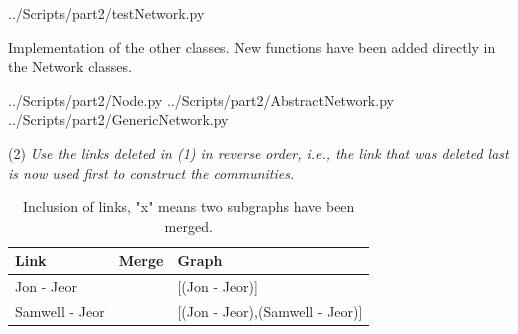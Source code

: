 \documentclass[10pt,a4paper]{article}
\begin{document}
\begin{enumerate}
	 {../Scripts/part2/testNetwork.py}
	
	Implementation of the other classes. New functions have been added directly in the Network classes. 
	
	 {../Scripts/part2/Node.py}
	 {../Scripts/part2/AbstractNetwork.py}
	 {../Scripts/part2/GenericNetwork.py}
	
	(2) \textit{Use the links deleted in (1) in reverse order, i.e., the link that was deleted last is now
		used first to construct the communities.}
	
\begin{table}[H]
	\centering
	\caption{Inclusion of links, "x" means two subgraphs have been merged.}
	\label{tabitab}
	\begin{tabular}{|l|l|l|}
		\hline
		Link              & Merge & Graph                                                                                                                                                                                                                                                                                                                                                                                                                                                                                                \\ \hline
		Jon - Jeor        &       & {[}(Jon - Jeor){]}                                                                                                                                                                                                                                                                                                                                                                                                                                                                                   \\ \hline
		Samwell - Jeor    &       & {[}(Jon - Jeor),(Samwell - Jeor){]}                                                                                                                                                                                                                                                                                                                                                                                                                                                                  \\ \hline

\end{tabular}
\end{table}
\end{enumerate}
\end{document}
